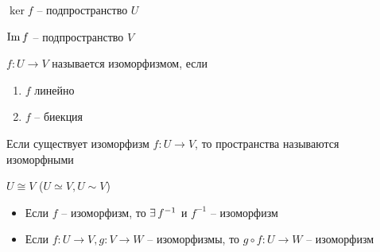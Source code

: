 \begin{props}
	\item $ \ker f $ -- подпространство $ U $
    \item $ \operatorname{Im} f $ -- подпространство $ V $
\end{props}

\begin{definition}
	$ f : U \to V $ называется изоморфизмом, если
    \begin{enumerate}
    	\item $f$ линейно
        \item $f$ -- биекция
    \end{enumerate}
    Если существует изоморфизм $ f : U \to V $, то пространства называются изоморфными
    \begin{notation}
    	$ U \cong V $ ($U \simeq V, U \sim V $)
    \end{notation}
\end{definition}

\begin{props}
	\item
    \begin{itemize}
        \item Если $f$ -- изоморфизм, то $ \exists\, f^{-1} $ и $ f^{-1} $ -- изоморфизм
        \item Если $ f : U \to V, g : V \to W $ -- изоморфизмы, то $ g \circ f : U \to W $ -- изоморфизм
    \end{itemize}

\end{props}
